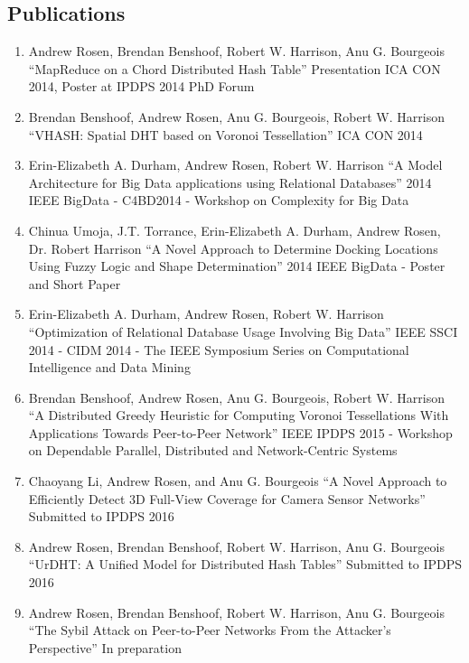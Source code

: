 \documentclass{res}
\begin{document}
\begin{resume}
\section{Publications}
\begin{enumerate}
	\item Andrew Rosen, Brendan Benshoof, Robert W. Harrison, Anu G. Bourgeois
	``MapReduce on a Chord Distributed Hash Table''
	Presentation ICA CON 2014, Poster at IPDPS 2014 PhD Forum
	\item Brendan Benshoof, Andrew Rosen, Anu G. Bourgeois, Robert W. Harrison
	``VHASH: Spatial DHT based on Voronoi Tessellation''
	ICA CON 2014
	\item  Erin-Elizabeth A. Durham, Andrew Rosen, Robert W. Harrison
	``A Model Architecture for Big Data applications using Relational Databases''
	2014 IEEE BigData - C4BD2014 - Workshop on Complexity for Big Data
	\item Chinua Umoja, J.T. Torrance, Erin-Elizabeth A. Durham, Andrew Rosen, Dr. Robert Harrison
	``A Novel Approach to Determine Docking Locations Using Fuzzy Logic and Shape Determination''
	2014 IEEE BigData - Poster and Short Paper
	\item  Erin-Elizabeth A. Durham, Andrew Rosen, Robert W. Harrison
	``Optimization of Relational Database Usage Involving Big Data''
	IEEE SSCI 2014 - CIDM 2014 - The IEEE Symposium Series on Computational Intelligence and Data Mining
	\item Brendan Benshoof, Andrew Rosen, Anu G. Bourgeois, Robert W. Harrison
	``A Distributed Greedy Heuristic for Computing Voronoi Tessellations With Applications Towards Peer-to-Peer Network''
	IEEE IPDPS 2015 - Workshop on Dependable Parallel, Distributed and Network-Centric Systems
	\item Chaoyang Li, Andrew Rosen,  and Anu G. Bourgeois
	``A Novel Approach to Efficiently Detect 3D Full-View Coverage for Camera Sensor Networks''
	Submitted to IPDPS 2016 
	\item Andrew Rosen, Brendan Benshoof, Robert W. Harrison, Anu G. Bourgeois
	``UrDHT: A Unified Model for Distributed Hash Tables''
	Submitted to IPDPS 2016
	\item Andrew Rosen, Brendan Benshoof, Robert W. Harrison, Anu G. Bourgeois
	``The Sybil Attack on Peer-to-Peer Networks From the Attacker's Perspective''
	In preparation
	
\end{enumerate}


\newpage


\end{resume}
\end{document}
